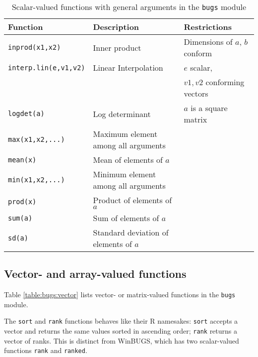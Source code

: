 \documentclass[11pt, a4paper, titlepage]{report}
\newcommand{\WinBUGS}{\textsf{WinBUGS}}
\begin{document}
\begin{table}
\begin{tabular}{lll}
\hline
Function & Description & Restrictions \\
\hline
\verb+inprod(x1,x2)+ & Inner product & Dimensions of $a$, $b$ conform \\
\verb+interp.lin(e,v1,v2)+ & Linear Interpolation & $e$ scalar, \\
                          &                     & $v1,v2$ conforming vectors \\
\verb+logdet(a)+ & Log determinant & $a$ is a square matrix \\
\verb+max(x1,x2,...)+ & Maximum element among all arguments & \\
\verb+mean(x)+  & Mean of elements of $a$ & \\
\verb+min(x1,x2,...)+ & Minimum element among all arguments & \\
\verb+prod(x)+  & Product of elements of $a$ & \\
\verb+sum(a)+   & Sum of elements of $a$& \\
\verb+sd(a)+    & Standard deviation of elements of $a$ & \\
\hline
\end{tabular}
\caption{Scalar-valued functions with general
  arguments in the \texttt{bugs} module \label{table:bugs:scalar2}}
\end{table}

\subsection{Vector- and array-valued functions}

Table \ref{table:bugs:vector} lists vector- or matrix-valued functions
in the \texttt{bugs} module.

The \texttt{sort} and \texttt{rank} functions behaves like their R
namesakes: \texttt{sort} accepts a vector and returns the same values
sorted in ascending order; \texttt{rank} returns a vector of ranks.
This is distinct from \WinBUGS, which has two scalar-valued functions
\verb+rank+ and \verb+ranked+.
\end{document}
